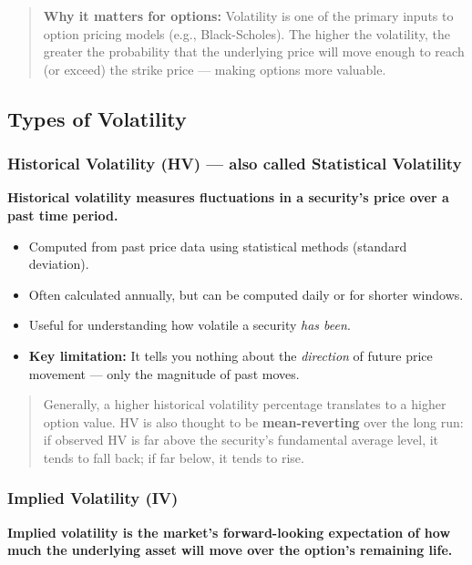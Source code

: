 \documentclass[12pt,openany]{book}
\begin{document}
\begin{quote}
\textbf{Why it matters for options:} Volatility is one of the primary inputs to option pricing models (e.g., Black-Scholes). The higher the volatility, the greater the probability that the underlying price will move enough to reach (or exceed) the strike price — making options more valuable.
\end{quote}

\subsection{Types of Volatility}

\subsubsection{Historical Volatility (HV) — also called Statistical Volatility}

\textbf{Historical volatility measures fluctuations in a security's price over a past time period.}

\begin{itemize}[leftmargin=*]
    \item Computed from past price data using statistical methods (standard deviation).
    \item Often calculated annually, but can be computed daily or for shorter windows.
    \item Useful for understanding how volatile a security \emph{has been}.
    \item \textbf{Key limitation:} It tells you nothing about the \emph{direction} of future price movement — only the magnitude of past moves.
\end{itemize}

\begin{quote}
Generally, a higher historical volatility percentage translates to a higher option value.
HV is also thought to be \textbf{mean-reverting} over the long run: if observed HV is far above the security's fundamental average level, it tends to fall back; if far below, it tends to rise.
\end{quote}

\subsubsection{Implied Volatility (IV)}

\textbf{Implied volatility is the market's forward-looking expectation of how much the underlying asset will move over the option's remaining life.}
\end{document}
